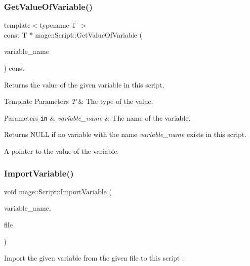 \subsubsection{\texorpdfstring{Get\+Value\+Of\+Variable()}{GetValueOfVariable()}}
{\footnotesize\ttfamily template$<$typename T $>$ \\
const T $\ast$ mage\+::\+Script\+::\+Get\+Value\+Of\+Variable (\begin{DoxyParamCaption}\item[{const string \&}]{variable\+\_\+name }\end{DoxyParamCaption}) const}

Returns the value of the given variable in this script.


\begin{DoxyTemplParams}{Template Parameters}
{\em T} & The type of the value. \\
\hline
\end{DoxyTemplParams}

\begin{DoxyParams}[1]{Parameters}
\mbox{\tt in}  & {\em variable\+\_\+name} & The name of the variable. \\
\hline
\end{DoxyParams}
\begin{DoxyReturn}{Returns}
{\ttfamily N\+U\+LL} if no variable with the name {\itshape variable\+\_\+name} exists in this script. 

A pointer to the value of the variable. 
\end{DoxyReturn}
\hypertarget{classmage_1_1_script_a831948e158eb3ee9f0bc5175cad89912}{}\label{classmage_1_1_script_a831948e158eb3ee9f0bc5175cad89912} 
\subsubsection{\texorpdfstring{Import\+Variable()}{ImportVariable()}}
{\footnotesize\ttfamily void mage\+::\+Script\+::\+Import\+Variable (\begin{DoxyParamCaption}\item[{const string \&}]{variable\+\_\+name,  }\item[{F\+I\+LE $\ast$}]{file }\end{DoxyParamCaption})}

Import the given variable from the given file to this script .

